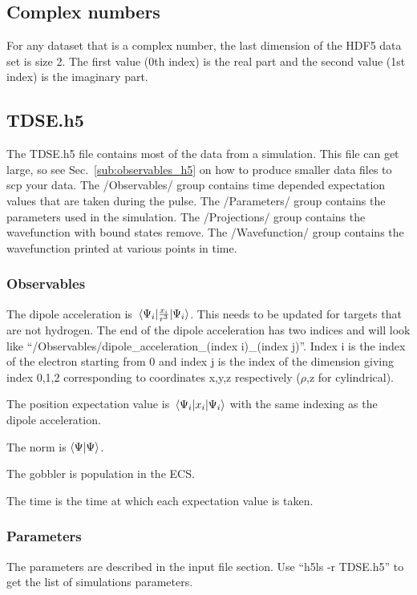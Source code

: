 \documentclass{article}
\begin{document}
\subsection{Complex numbers} %
\label{sub:complex_numbers}
For any dataset that is a complex number, the last dimension of the HDF5 data set is size 2. The first value (0th index) is the real part and the second value (1st index) is the imaginary part.

\subsection{TDSE.h5} %
\label{sub:tdse_h5}
The TDSE.h5 file contains most of the data from a simulation. This file can get large, so see Sec.~\ref{sub:observables_h5} on how to produce smaller data files to scp your data. The /Observables/ group contains time depended expectation values that are taken during the pulse. The /Parameters/ group contains the parameters used in the simulation. The /Projections/ group contains the wavefunction with bound states remove. The /Wavefunction/ group contains the wavefunction printed at various points in time.

\subsubsection{Observables} %
\label{ssub:observables}
The dipole acceleration is $\expval{\frac{x_i}{r^3}}{\Psi_i}$. This needs to be updated for targets that are not hydrogen. The end of the dipole acceleration has two indices and will look like ``/Observables/dipole\_acceleration\_(index i)\_(index j)''. Index i is the index of the electron starting from 0 and index j is the index of the dimension giving index 0,1,2 corresponding to coordinates x,y,z respectively ($\rho$,z for cylindrical).

The position expectation value is $\expval{x_i}{\Psi_i}$ with the same indexing as the dipole acceleration.

The norm is $\bra{\Psi}\ket{\Psi}$.

The gobbler is population in the ECS.

The time is the time at which each expectation value is taken.

\subsubsection{Parameters} %
\label{ssub:parameters}
The parameters are described in the input file section. Use ``h5ls -r TDSE.h5'' to get the list of simulations parameters.
\end{document}
